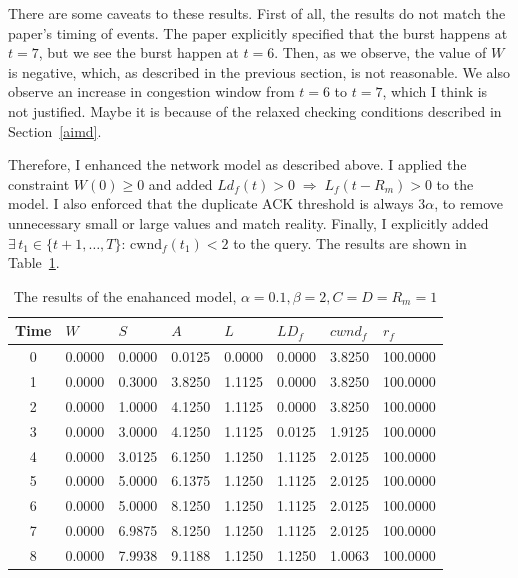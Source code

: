\documentclass[12pt]{l4dc2023}
\begin{document}
There are some caveats to these results. First of all, the results do not match the paper's timing of events. The paper explicitly specified that the burst happens at \(t=7\), but we see the burst happen at \(t=6\). Then, as we observe, the value of \(W\) is negative, which, as described in the previous section, is not reasonable. We also observe an increase in congestion window from \(t=6\) to \(t=7\), which I think is not justified. Maybe it is because of the relaxed checking conditions described in Section~\ref{aimd}. 

Therefore, I enhanced the network model as described above. I applied the constraint \(W(0)\ge0\) and added \(Ld_f(t)>0\;\Longrightarrow\;L_f(t-R_m)>0\) to the model. I also enforced that the duplicate ACK threshold is always \(3\alpha\), to remove unnecessary small or large values and match reality. Finally, I explicitly added \(\exists\,t_1\in\{t{+}1,\dots,T\}:\,\mathrm{cwnd}_f(t_1)<2\) to the query. The results are shown in Table~\ref{tab:aimd_2}.

\begin{table}[ht]
\centering
\begin{tabular}{|c|l|l|l|l|l|l|l|}
\hline
\textbf{Time} & \textbf{$W$} & \textbf{$S$} & \textbf{$A$} & \textbf{$L$} & \textbf{$LD_f$} & \textbf{$cwnd_f$} & \textbf{$r_f$} \\
\hline
0 & 0.0000 & 0.0000 & 0.0125 & 0.0000 & 0.0000 & 3.8250 & 100.0000 \\
1 & 0.0000 & 0.3000 & 3.8250 & 1.1125 & 0.0000 & 3.8250 & 100.0000 \\
2 & 0.0000 & 1.0000 & 4.1250 & 1.1125 & 0.0000 & 3.8250 & 100.0000 \\
3 & 0.0000 & 3.0000 & 4.1250 & 1.1125 & 0.0125 & 1.9125 & 100.0000 \\
4 & 0.0000 & 3.0125 & 6.1250 & 1.1250 & 1.1125 & 2.0125 & 100.0000 \\
5 & 0.0000 & 5.0000 & 6.1375 & 1.1250 & 1.1125 & 2.0125 & 100.0000 \\
6 & 0.0000 & 5.0000 & 8.1250 & 1.1250 & 1.1125 & 2.0125 & 100.0000 \\
7 & 0.0000 & 6.9875 & 8.1250 & 1.1250 & 1.1125 & 2.0125 & 100.0000 \\
8 & 0.0000 & 7.9938 & 9.1188 & 1.1250 & 1.1250 & 1.0063 & 100.0000 \\
\hline
\end{tabular}
\caption{The results of the enahanced model, $\alpha=0.1, \beta=2, C=D=R_m=1$}
\label{tab:aimd_2}
\end{table}
\end{document}
